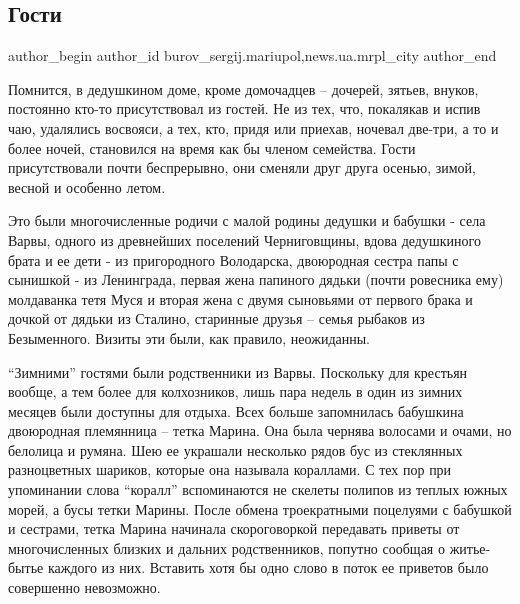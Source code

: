 
 
 
 
 
 
\subsection{Гости}
\label{sec:17_03_2018.stz.news.ua.mrpl_city.1.gosti}
 
\ifcmt
 author_begin
   author_id burov_sergij.mariupol,news.ua.mrpl_city
 author_end
\fi

Помнится, в дедушкином доме, кроме домочадцев – дочерей, зятьев, внуков,
постоянно кто-то присутствовал из гостей. Не из тех, что, покалякав и испив
чаю, удалялись восвояси, а тех, кто, придя или приехав, ночевал две-три, а то и
более ночей, становился на время как бы членом семейства. Гости присутствовали
почти беспрерывно, они сменяли друг друга осенью, зимой, весной и особенно
летом.


Это были многочисленные родичи с малой родины дедушки и бабушки - села Варвы,
одного из древнейших поселений Черниговщины, вдова дедушкиного брата и ее дети
- из пригородного Володарска, двоюродная сестра папы с сынишкой - из
Ленинграда, первая жена папиного дядьки  (почти ровесника ему) молдаванка тетя
Муся и вторая жена с двумя сыновьями от первого брака и дочкой от дядьки из
Сталино, старинные друзья – семья рыбаков из Безыменного. Визиты эти были, как
правило, неожиданны.

\enquote{Зимними} гостями были родственники из Варвы. Поскольку для крестьян
вообще, а тем более для колхозников, лишь пара недель в один из зимних месяцев
были доступны для отдыха. Всех больше запомнилась бабушкина двоюродная
племянница – тетка Марина. Она была чернява волосами и очами, но белолица и
румяна. Шею ее украшали несколько рядов бус из стеклянных разноцветных шариков,
которые она называла кораллами. С тех пор при упоминании слова \enquote{коралл}
вспоминаются не скелеты полипов из теплых южных морей, а бусы тетки Марины.
После обмена троекратными поцелуями с бабушкой и сестрами, тетка Марина
начинала скороговоркой передавать приветы от многочисленных близких и дальних
родственников, попутно сообщая о житье-бытье каждого из них.  Вставить хотя бы
одно слово в поток ее приветов было совершенно невозможно.


